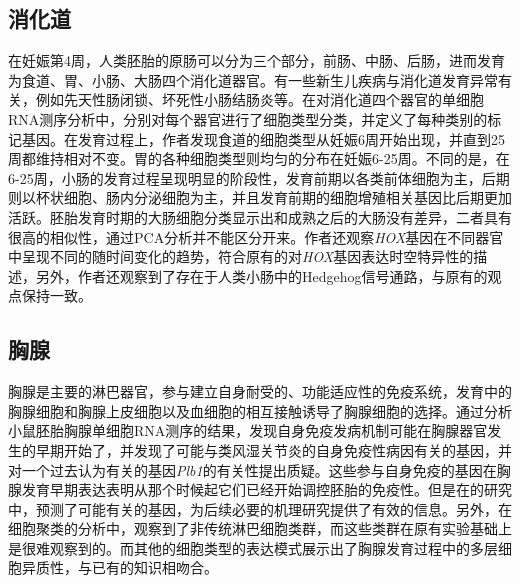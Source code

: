 \documentclass[lang=cn]{elegantpaper}
\begin{document}
\subsection{消化道}
在妊娠第4周，人类胚胎的原肠可以分为三个部分，前肠、中肠、后肠，进而发育为食道、胃、小肠、大肠四个消化道器官\citep{kraus_patterning_2012}。有一些新生儿疾病与消化道发育异常有关，例如先天性肠闭锁、坏死性小肠结肠炎等\citep{palm_immunoglobulin_2014}。在对消化道四个器官的单细胞RNA测序分析中，\cite{gao_tracing_2018}分别对每个器官进行了细胞类型分类，并定义了每种类别的标记基因。在发育过程上，作者发现食道的细胞类型从妊娠6周开始出现，并直到25周都维持相对不变。胃的各种细胞类型则均匀的分布在妊娠6-25周。不同的是，在6-25周，小肠的发育过程呈现明显的阶段性，发育前期以各类前体细胞为主，后期则以杯状细胞、肠内分泌细胞为主，并且发育前期的细胞增殖相关基因比后期更加活跃。胚胎发育时期的大肠细胞分类显示出和成熟之后的大肠没有差异，二者具有很高的相似性，通过PCA分析并不能区分开来。作者还观察\emph{HOX}基因在不同器官中呈现不同的随时间变化的趋势\citep{beck_homeobox_2002}，符合原有的对\emph{HOX}基因表达时空特异性的描述，另外，作者还观察到了存在于人类小肠中的Hedgehog信号通路，与原有的观点保持一致\citep{van_den_brink_indian_2004}。

\subsection{胸腺}
胸腺是主要的淋巴器官，参与建立自身耐受的、功能适应性的免疫系统\citep{gruver_cytokines_2008}，发育中的胸腺细胞和胸腺上皮细胞以及血细胞的相互接触诱导了胸腺细胞的选择\citep{hogquist_central_2005}。通过分析小鼠胚胎胸腺单细胞RNA测序的结果，\cite{kernfeld_single-cell_2018}发现自身免疫发病机制可能在胸腺器官发生的早期开始了，并发现了可能与类风湿关节炎的自身免疫性病因有关的基因，并对一个过去认为有关的基因\emph{Plb1}\citep{okada_integration_2014}的有关性提出质疑。这些参与自身免疫的基因在胸腺发育早期表达表明从那个时候起它们已经开始调控胚胎的免疫性。但是在\cite{kernfeld_single-cell_2018}的研究中，预测了可能有关的基因，为后续必要的机理研究提供了有效的信息。另外，在细胞聚类的分析中，\cite{kernfeld_single-cell_2018}观察到了非传统淋巴细胞类群，而这些类群在原有实验基础上是很难观察到的\citep{brennecke_single-cell_2015}。而其他的细胞类型的表达模式展示出了胸腺发育过程中的多层细胞异质性，与已有的知识相吻合\citep{fischer_beyond_2017}。
\end{document}
